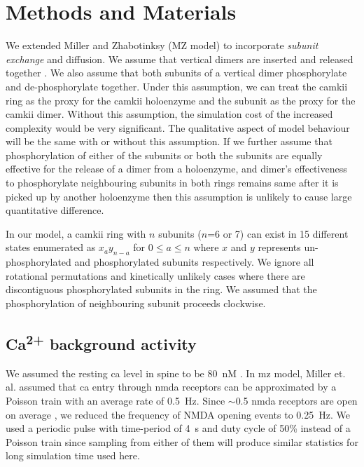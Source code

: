 \documentclass[9pt,lineno]{elife}
\newcommand\SUP[2]{#1\textsuperscript{#2}}
\begin{document}
\section{Methods and Materials}{\label{sec:materials_and_methods} 

We extended Miller and Zhabotinksy (MZ model) \citep{miller_stability_2005} to
incorporate \emph{subunit exchange} and diffusion. We assume that vertical
dimers are inserted and released together \citep{bhattacharyya_molecular_2016}.
We also assume that both subunits of a vertical dimer phosphorylate and
de-phosphorylate together. Under this assumption, we can treat the \gls{camkii}
ring as the proxy for the \gls{camkii} holoenzyme and the subunit as the proxy
for the \gls{camkii} dimer. Without this assumption, the simulation cost of the
increased complexity would be very significant. The qualitative aspect of model
behaviour will be the same with or without this assumption. If we further assume
that phosphorylation of either of the subunits or both the subunits are equally
effective for the release of a dimer from a holoenzyme, and dimer's
effectiveness to phosphorylate neighbouring subunits in both rings remains same
after it is picked up by another holoenzyme then this assumption is unlikely to
cause large quantitative difference. 

In our model, a \gls{camkii} ring with $n$ subunits ($n$=6 or 7) can exist
in 15 different states enumerated as $x_{a}y_{n-a}$ for $0 \le a \le n$ where
$x$ and $y$ represents un-phosphorylated and phosphorylated subunits
respectively. We ignore all rotational permutations and kinetically unlikely
cases where there are discontiguous phosphorylated subunits in the ring. We
assumed that the phosphorylation of neighbouring subunit proceeds clockwise.

\subsection{\SUP{Ca}{2+} background activity}\label{subsec:calcium_background}

We assumed the resting \gls{ca} level in spine to be \SI{80}{\nano M}
\citep{berridge_neuronal_1998}. In \gls{mz} model, Miller et. al. assumed that
\gls{ca} entry through \gls{nmda} receptors can be approximated by a Poisson
train with an average rate of \SI{0.5}{Hz}.  Since $\sim$0.5 \gls{nmda}
receptors are open on average \citep{nimchinsky_number_2004}, we reduced the
frequency of NMDA opening events to \SI{0.25}{Hz}. We used a periodic pulse with
time-period of \SI{4}{\second} and duty cycle of 50\% instead of a Poisson train
since sampling from either of them will produce similar statistics for long
simulation time used here. 

}
\end{document}

